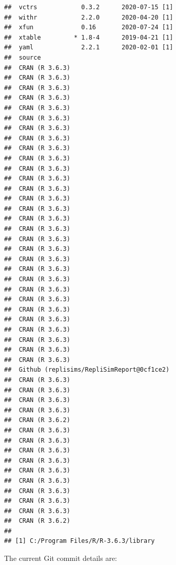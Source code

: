 \documentclass[10,a4paperpaper,]{article}
\begin{document}
\begin{verbatim}
##  vctrs            0.3.2      2020-07-15 [1]
##  withr            2.2.0      2020-04-20 [1]
##  xfun             0.16       2020-07-24 [1]
##  xtable         * 1.8-4      2019-04-21 [1]
##  yaml             2.2.1      2020-02-01 [1]
##  source                                   
##  CRAN (R 3.6.3)                           
##  CRAN (R 3.6.3)                           
##  CRAN (R 3.6.3)                           
##  CRAN (R 3.6.3)                           
##  CRAN (R 3.6.3)                           
##  CRAN (R 3.6.3)                           
##  CRAN (R 3.6.3)                           
##  CRAN (R 3.6.3)                           
##  CRAN (R 3.6.3)                           
##  CRAN (R 3.6.3)                           
##  CRAN (R 3.6.3)                           
##  CRAN (R 3.6.3)                           
##  CRAN (R 3.6.3)                           
##  CRAN (R 3.6.3)                           
##  CRAN (R 3.6.3)                           
##  CRAN (R 3.6.3)                           
##  CRAN (R 3.6.3)                           
##  CRAN (R 3.6.3)                           
##  CRAN (R 3.6.3)                           
##  CRAN (R 3.6.3)                           
##  CRAN (R 3.6.3)                           
##  CRAN (R 3.6.3)                           
##  CRAN (R 3.6.3)                           
##  CRAN (R 3.6.3)                           
##  CRAN (R 3.6.3)                           
##  CRAN (R 3.6.3)                           
##  CRAN (R 3.6.3)                           
##  CRAN (R 3.6.3)                           
##  CRAN (R 3.6.3)                           
##  CRAN (R 3.6.3)                           
##  Github (replisims/RepliSimReport@0cf1ce2)
##  CRAN (R 3.6.3)                           
##  CRAN (R 3.6.3)                           
##  CRAN (R 3.6.3)                           
##  CRAN (R 3.6.3)                           
##  CRAN (R 3.6.2)                           
##  CRAN (R 3.6.3)                           
##  CRAN (R 3.6.3)                           
##  CRAN (R 3.6.3)                           
##  CRAN (R 3.6.3)                           
##  CRAN (R 3.6.3)                           
##  CRAN (R 3.6.3)                           
##  CRAN (R 3.6.3)                           
##  CRAN (R 3.6.3)                           
##  CRAN (R 3.6.3)                           
##  CRAN (R 3.6.2)                           
## 
## [1] C:/Program Files/R/R-3.6.3/library
\end{verbatim}

The current Git commit details are:
\end{document}
